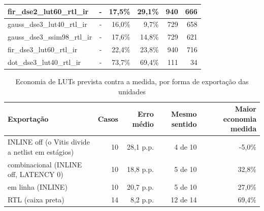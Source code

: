 \begin{table}[htbp]
\begin{tabular}{|l|r|r|r|r|r|}
fir\_dse2\_lut60\_rtl\_ir & - & 17,5\% & 29,1\% & 940 & 666 \\ \hline
gauss\_dse3\_lut40\_rtl\_ir & - & 16,0\% & 9,7\% & 729 & 658 \\ \hline
gauss\_dse3\_ssim98\_rtl\_ir & - & 17,6\% & 14,8\% & 729 & 621 \\ \hline
fir\_dse3\_lut60\_rtl\_ir & - & 22,4\% & 23,8\% & 940 & 716 \\ \hline
dot\_dse3\_lut40\_rtl\_ir & - & 73,7\% & 69,4\% & 111 & 34 \\ \hline
\end{tabular}
\end{table}

\begin{table}[htbp]
\centering
\caption{Economia de LUTs prevista contra a medida, por forma de exportação das unidades}
\begin{tabular}{|l|r|r|r|r|}
\hline
\rowcolor{tabAzul}\color{white}Exportação & \color{white}Casos & \color{white}Erro médio & \color{white}Mesmo sentido & \color{white}Maior economia medida \\
\hline
INLINE off (o Vitis divide a netlist em estágios) & 10 & 28,1 p.p. & 4 de 10 & -5,0\% \\ \hline
combinacional (INLINE off, LATENCY 0) & 10 & 18,8 p.p. & 5 de 10 & 32,8\% \\ \hline
em linha (INLINE) & 10 & 20,7 p.p. & 5 de 10 & 27,0\% \\ \hline
RTL (caixa preta) & 14 & 8,2 p.p. & 12 de 14 & 69,4\% \\ \hline
\end{tabular}
\end{table}

